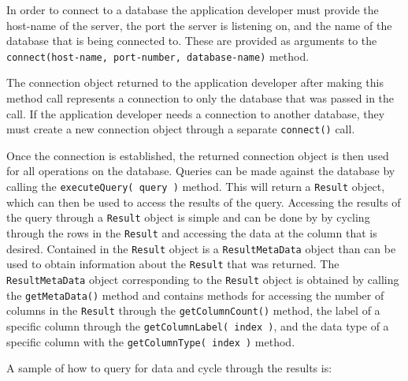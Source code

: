 \documentclass[letterpaper, 12pt]{article}
\begin{document}
  In order to connect to a database the application developer must provide the
  host-name of the server, the port the server is listening on, and the name of the
  database that is being connected to. These are provided as arguments to the
  \lstinline[basicstyle=\ttfamily]|connect(host-name, port-number, database-name)|
  method.
  \par\vspace{\baselineskip}
  The connection object returned to the application developer after making this method
  call represents a connection to only the database that was passed in the call. If the
  application developer needs a connection to another database, they must create a new
  connection object through a separate
  \lstinline[basicstyle=\ttfamily]|connect()| call.
  \par\vspace{\baselineskip}
  Once the connection is established, the returned connection object is then used for all
  operations on the database. Queries can be made against the database by calling
  the \lstinline[basicstyle=\ttfamily]|executeQuery( query )|
  method. This will return a \lstinline[basicstyle=\ttfamily]|Result| object, which can
  then be used to access the results of the query. Accessing the results of the query
  through a \lstinline[basicstyle=\ttfamily]|Result| object is simple and can be done by
  by cycling through the rows in the
  \lstinline[basicstyle=\ttfamily]|Result| and accessing the data at the column that
  is desired. Contained in the \lstinline[basicstyle=\ttfamily]|Result| object is a
  \lstinline[basicstyle=\ttfamily]|ResultMetaData| object than can be used to obtain
  information about the \lstinline[basicstyle=\ttfamily]|Result| that was returned.
  The \lstinline[basicstyle=\ttfamily]|ResultMetaData| object corresponding to the
  \lstinline[basicstyle=\ttfamily]|Result| object is obtained by calling the
  \lstinline[basicstyle=\ttfamily]|getMetaData()| method and contains
  methods for accessing the number of columns in the
  \lstinline[basicstyle=\ttfamily]|Result| through the
  \lstinline[basicstyle=\ttfamily]|getColumnCount()| method, the
  label of a specific column through the
  \lstinline[basicstyle=\ttfamily]|getColumnLabel( index )|,
  and the data type of a specific column with the
  \lstinline[basicstyle=\ttfamily]|getColumnType( index )| method.
  \par\vspace{\baselineskip}
  A sample of how to query for data and cycle through the results is:
\end{document}
